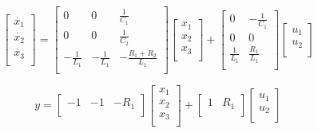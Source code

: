 \documentclass{article}
\begin{document}
\begin{equation*}       %
    \left[                %
    \begin{array}{c}   %
    \dot{x_1} \\  %
    \dot{x_2} \\  %
    \dot{x_3} \\
    \end{array}
    \right]=      %
    \left[                %
    \begin{array}{ccc}   %
    0 & 0 & \frac{1}{C_1}\\
    0 & 0 & \frac{1}{C_2}\\
    -\frac{1}{L_1} & -\frac{1}{L_1} & -\frac{R_1+R_2}{L_1}\\    
    \end{array}
    \right]
    \left[                %
    \begin{array}{c}   %
    x_1 \\  %
    x_2 \\  %
    x_3 \\
    \end{array}
    \right]+
    \left[                %
    \begin{array}{cc}   %
    0 & -\frac{1}{C_1} \\  %
    0 & 0 \\  %
    \frac{1}{L_1} & \frac{R_1}{L_1} \\
    \end{array}
    \right]
    \left[                %
    \begin{array}{c}   %
    u_1 \\  %
    u_2 \\  %
    \end{array}
    \right]               
\end{equation*}

\begin{equation*}
    y=\left[
    \begin{array}{ccc}
    -1 & -1 & -R_1\\
    \end{array}
    \right]
    \left[
    \begin{array}{c}
    x_1 \\  %
    x_2 \\  %
    x_3 \\
    \end{array}
    \right]+
    \left[
    \begin{array}{cc}
    1 & R_1\\  %
    \end{array}
    \right]
    \left[
    \begin{array}{c}
    u_1 \\  %
    u_2 \\  %
    \end{array}
    \right]
    \end{equation*}
\end{document}
